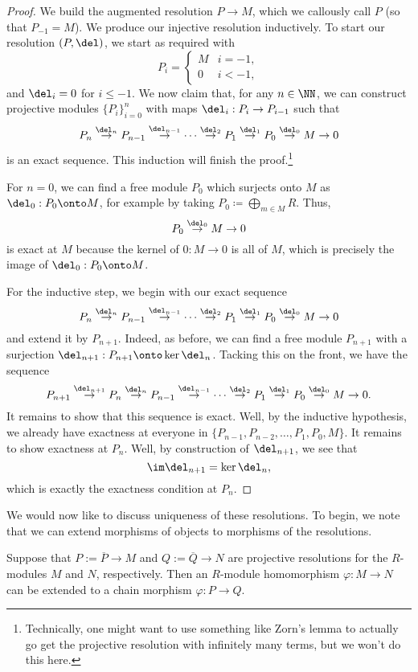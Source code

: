 \documentclass[../notes.tex]{subfiles}
\begin{document}
\begin{proof}
	We build the augmented resolution $P\to M$, which we callously call $P$ (so that $P_{-1}=M$). We produce our injective resolution inductively. To start our resolution $(P,\del)$, we start as required with
	\[P_i=\begin{cases}
		M & i=-1, \\
		0 & i<-1,
	\end{cases}\]
	and $\del_i=0$ for $i\le-1$. We now claim that, for any $n\in\NN$, we can construct projective modules $\{P_i\}_{i=0}^n$ with maps $\del_i:P_i\to P_{i-1}$ such that
	\[P_n\stackrel{\del_n}\to P_{n-1}\stackrel{\del_{n-1}}\to\cdots\stackrel{\del_{2}}\to P_1\stackrel{\del_1}\to P_0\stackrel{\del_0}\to M\to 0\]
	is an exact sequence. This induction will finish the proof.\footnote{Technically, one might want to use something like Zorn's lemma to actually go get the projective resolution with infinitely many terms, but we won't do this here.}
	
	For $n=0$, we can find a free module $P_0$ which surjects onto $M$ as $\del_0:P_0\onto M$, for example by taking $P_0\coloneqq\bigoplus_{m\in M}R$. Thus,
	\[P_0\stackrel{\del_0}\to M\to0\]
	is exact at $M$ because the kernel of $0:M\to 0$ is all of $M$, which is precisely the image of $\del_0:P_0\onto M$.
	
	For the inductive step, we begin with our exact sequence
	\[P_n\stackrel{\del_n}\to P_{n-1}\stackrel{\del_{n-1}}\to\cdots\stackrel{\del_{2}}\to P_1\stackrel{\del_1}\to P_0\stackrel{\del_0}\to M\to 0\]
	and extend it by $P_{n+1}$. Indeed, as before, we can find a free module $P_{n+1}$ with a surjection $\del_{n+1}:P_{n+1}\onto\ker\del_n$. Tacking this on the front, we have the sequence
	\[P_{n+1}\stackrel{\del_{n+1}}\to P_n\stackrel{\del_n}\to P_{n-1}\stackrel{\del_{n-1}}\to\cdots\stackrel{\del_{2}}\to P_1\stackrel{\del_1}\to P_0\stackrel{\del_0}\to M\to 0.\]
	It remains to show that this sequence is exact. Well, by the inductive hypothesis, we already have exactness at everyone in $\{P_{n-1},P_{n-2},\ldots,P_1,P_0,M\}$. It remains to show exactness at $P_n$. Well, by construction of $\del_{n+1}$, we see that
	\[\im\del_{n+1}=\ker\del_n,\]
	which is exactly the exactness condition at $P_n$.
\end{proof}
We would now like to discuss uniqueness of these resolutions. To begin, we note that we can extend morphisms of objects to morphisms of the resolutions.
\begin{lemma} \label{lem:inducechainmorphism}
	Suppose that $P:=\overline P\to M$ and $Q:=\overline Q\to N$ are projective resolutions for the $R$-modules $M$ and $N$, respectively. Then an $R$-module homomorphism $\varphi:M\to N$ can be extended to a chain morphism $\varphi:P\to Q$.
\end{lemma}
\end{document}
